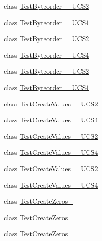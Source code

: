 \begin{DoxyCompactItemize}
class \hyperlink{classnumpy_1_1core_1_1tests_1_1test__unicode_1_1TestByteorder__1009__UCS2}{Test\+Byteorder\+\_\+\_\+\+U\+C\+S2}
\item 
class \hyperlink{classnumpy_1_1core_1_1tests_1_1test__unicode_1_1TestByteorder__1009__UCS4}{Test\+Byteorder\+\_\+\_\+\+U\+C\+S4}
\item 
class \hyperlink{classnumpy_1_1core_1_1tests_1_1test__unicode_1_1TestByteorder__1__UCS2}{Test\+Byteorder\+\_\+\_\+\+U\+C\+S2}
\item 
class \hyperlink{classnumpy_1_1core_1_1tests_1_1test__unicode_1_1TestByteorder__1__UCS4}{Test\+Byteorder\+\_\+\_\+\+U\+C\+S4}
\item 
class \hyperlink{classnumpy_1_1core_1_1tests_1_1test__unicode_1_1TestByteorder__2__UCS2}{Test\+Byteorder\+\_\+\_\+\+U\+C\+S2}
\item 
class \hyperlink{classnumpy_1_1core_1_1tests_1_1test__unicode_1_1TestByteorder__2__UCS4}{Test\+Byteorder\+\_\+\_\+\+U\+C\+S4}
\item 
class \hyperlink{classnumpy_1_1core_1_1tests_1_1test__unicode_1_1TestCreateValues__1009__UCS2}{Test\+Create\+Values\+\_\+\_\+\+U\+C\+S2}
\item 
class \hyperlink{classnumpy_1_1core_1_1tests_1_1test__unicode_1_1TestCreateValues__1009__UCS4}{Test\+Create\+Values\+\_\+\_\+\+U\+C\+S4}
\item 
class \hyperlink{classnumpy_1_1core_1_1tests_1_1test__unicode_1_1TestCreateValues__1__UCS2}{Test\+Create\+Values\+\_\+\_\+\+U\+C\+S2}
\item 
class \hyperlink{classnumpy_1_1core_1_1tests_1_1test__unicode_1_1TestCreateValues__1__UCS4}{Test\+Create\+Values\+\_\+\_\+\+U\+C\+S4}
\item 
class \hyperlink{classnumpy_1_1core_1_1tests_1_1test__unicode_1_1TestCreateValues__2__UCS2}{Test\+Create\+Values\+\_\+\_\+\+U\+C\+S2}
\item 
class \hyperlink{classnumpy_1_1core_1_1tests_1_1test__unicode_1_1TestCreateValues__2__UCS4}{Test\+Create\+Values\+\_\+\_\+\+U\+C\+S4}
\item 
class \hyperlink{classnumpy_1_1core_1_1tests_1_1test__unicode_1_1TestCreateZeros__1}{Test\+Create\+Zeros\+\_}
\item 
class \hyperlink{classnumpy_1_1core_1_1tests_1_1test__unicode_1_1TestCreateZeros__1009}{Test\+Create\+Zeros\+\_}
\item 
class \hyperlink{classnumpy_1_1core_1_1tests_1_1test__unicode_1_1TestCreateZeros__2}{Test\+Create\+Zeros\+\_}
\end{DoxyCompactItemize}
